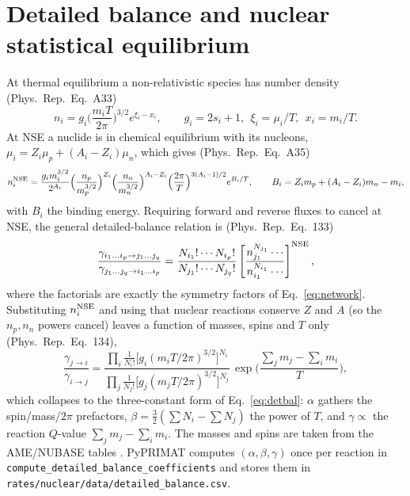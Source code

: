 \documentclass[11pt,a4paper]{article}
\newcommand{\code}[1]{\texttt{#1}}
\newcommand{\PR}{Phys.\ Rep.}
\begin{document}
\section{Detailed balance and nuclear statistical equilibrium}\label{app:nse}
At thermal equilibrium a non-relativistic species has number density (\PR\
Eq.~A33)
\begin{equation}
  n_i = g_i\Big(\frac{m_iT}{2\pi}\Big)^{3/2}e^{\xi_i-x_i},
  \qquad g_i=2s_i+1,\ \ \xi_i=\mu_i/T,\ \ x_i=m_i/T .
\end{equation}
At NSE a nuclide is in chemical equilibrium with its nucleons,
$\mu_i=Z_i\mu_p+(A_i-Z_i)\mu_n$, which gives (\PR\ Eq.~A35)
\begin{equation}
  n_i^{\rm NSE} = \frac{g_i m_i^{3/2}}{2^{A_i}}
    \Big(\frac{n_p}{m_p^{3/2}}\Big)^{Z_i}
    \Big(\frac{n_n}{m_n^{3/2}}\Big)^{A_i-Z_i}
    \Big(\frac{2\pi}{T}\Big)^{3(A_i-1)/2} e^{B_i/T},
  \qquad B_i = Z_im_p+(A_i-Z_i)m_n-m_i,
\end{equation}
with $B_i$ the binding energy. Requiring forward and reverse fluxes to cancel at
NSE, the general detailed-balance relation is (\PR\ Eq.~133)
\begin{equation}
  \frac{\gamma_{i_1\dots i_p\to j_1\dots j_q}}{\gamma_{j_1\dots j_q\to i_1\dots i_p}}
   = \frac{N_{i_1}!\cdots N_{i_p}!}{N_{j_1}!\cdots N_{j_q}!}
     \left[\frac{n_{j_1}^{N_{j_1}}\cdots}{n_{i_1}^{N_{i_1}}\cdots}\right]^{\rm NSE},
\end{equation}
where the factorials are exactly the symmetry factors of
Eq.~\eqref{eq:network}. Substituting $n_i^{\rm NSE}$ and using that nuclear
reactions conserve $Z$ and $A$ (so the $n_p,n_n$ powers cancel) leaves a function
of masses, spins and $T$ only (\PR\ Eq.~134),
\begin{equation}
  \frac{\gamma_{j\to i}}{\gamma_{i\to j}}
   = \frac{\prod_i \tfrac{1}{N_i!}\big[g_i(m_iT/2\pi)^{3/2}\big]^{N_i}}
          {\prod_j \tfrac{1}{N_j!}\big[g_j(m_jT/2\pi)^{3/2}\big]^{N_j}}\,
     \exp\!\Big(\frac{\sum_j m_j-\sum_i m_i}{T}\Big),
\end{equation}
which collapses to the three-constant form of Eq.~\eqref{eq:detbal}: $\alpha$
gathers the spin/mass/$2\pi$ prefactors, $\beta=\tfrac{3}{2}(\sum N_i-\sum N_j)$
the power of $T$, and $\gamma\propto$ the reaction $Q$-value $\sum_j m_j-\sum_i
m_i$. The masses and spins are taken from the AME/NUBASE tables
\cite{AME2016}. PyPRIMAT computes $(\alpha,\beta,\gamma)$ once per reaction in
\code{compute\_detailed\_balance\_coefficients} and stores them in
\code{rates/nuclear/data/detailed\_balance.csv}.
\end{document}
